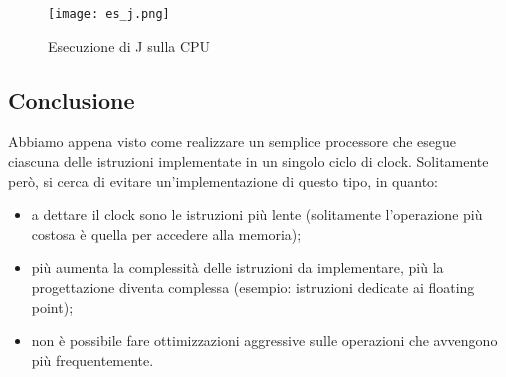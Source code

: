 \begin{figure}[H]
	\centering
	\texttt{[image: es\_j.png]}
	\caption{Esecuzione di J sulla CPU}
\end{figure}

\subsection*{Conclusione}
Abbiamo appena visto come realizzare un semplice processore che esegue ciascuna delle istruzioni implementate in un singolo ciclo di clock. Solitamente però, si cerca di evitare un'implementazione di questo tipo, in quanto:
\begin{itemize}
	\item a dettare il clock sono le istruzioni più lente (solitamente l'operazione più costosa è quella per accedere alla memoria);
	\item più aumenta la complessità delle istruzioni da implementare, più la progettazione diventa complessa (esempio: istruzioni dedicate ai floating point);
	\item non è possibile fare ottimizzazioni aggressive sulle operazioni che avvengono più frequentemente.
\end{itemize}


